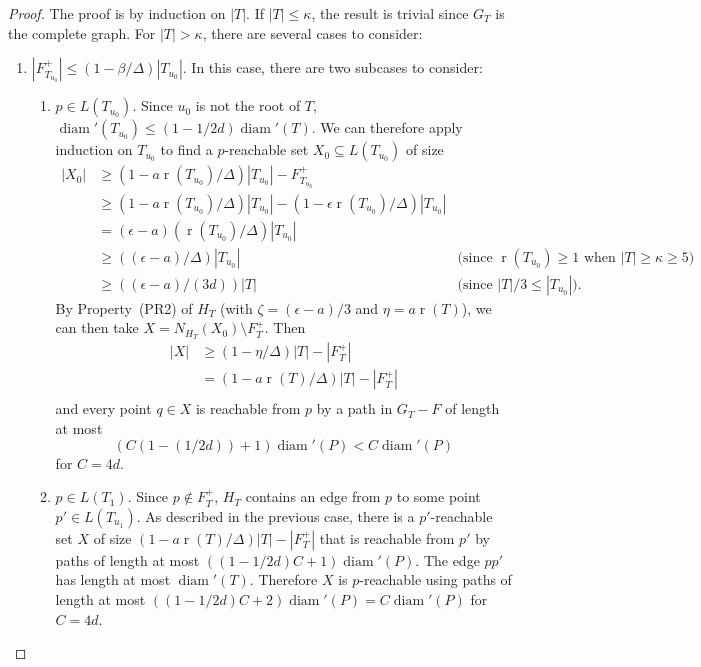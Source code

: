 \documentclass{patmorin}
\DeclareMathOperator{\rank}{r}
\DeclareMathOperator{\diam}{diam}
\begin{document}
\begin{proof}
  The proof is by induction on $|T|$.  If $|T|\le\kappa$, the result is
  trivial since $G_T$ is the complete graph.  For $|T|>\kappa$, there
  are several cases to consider:
  \begin{enumerate}
    \item $|F^+_{T_{u_0}}|\le (1-\beta/\Delta)|T_{u_0}|$. In this case, there are two subcases
    to consider:
    \begin{enumerate}
      \item $p\in L(T_{u_0})$. 
        Since $u_0$ is not the root of $T$, $\diam'(T_{u_0}) \le
        (1-1/2d)\diam'(T)$.  We can therefore apply induction on $T_{u_0}$
        to find a $p$-reachable set $X_0\subseteq L(T_{u_0})$ of size
\begin{align*}
  |X_0| & \ge (1-a\rank(T_{u_0})/\Delta)|T_{u_0}|-F^+_{T_{u_0}} \\
        & \ge (1-a\rank(T_{u_0})/\Delta)|T_{u_0}|-(1-\epsilon\rank(T_{u_0})/\Delta)|T_{u_0}| \\
        & = (\epsilon-a)(\rank(T_{u_0})/\Delta)|T_{u_0}| \\
        & \ge ((\epsilon-a)/\Delta)|T_{u_0}| 
    & \text{(since $\rank(T_{u_0})\ge 1$ when $|T|\ge \kappa \ge 5$)} \\
        & \ge ((\epsilon-a)/(3d))|T| 
        & \text{(since $|T|/3\le |T_{u_0}|$).} 
\end{align*}
      By Property~(PR2) of $H_T$ (with $\zeta = (\epsilon-a)/3$ and $\eta = a\rank(T)$), we can then take $X=N_{H_T}(X_0)\setminus F^+_T$.  Then 
      \begin{align*}
         |X| & \ge (1-\eta/\Delta)|T|-|F^+_T| \\
             & = (1-a\rank(T)/\Delta)|T|-|F^+_T| \\
      \end{align*} and every point $q\in X$ is reachable from $p$ by a path in $G_T-F$ of length at most
        \[ (C(1-(1/2d))+1)\diam'(P) < C\diam'(P) \]
       for $C= 4d$.

      \item $p\in L(T_1)$. Since $p\not\in F^+_T$, $H_T$ contains an
      edge from $p$ to some point $p'\in L(T_{u_1})$.  As described
      in the previous case, there is a $p'$-reachable set $X$ of
      size $(1-a\rank(T)/\Delta)|T|-|F^+_T|$ that is reachable from $p'$
      by paths of length at most $((1-1/2d)C+1)\diam'(P)$.
      The edge $pp'$ has length at most
      $\diam'(T)$. Therefore $X$ is $p$-reachable using
      paths of length at most $((1-1/2d)C+2)\diam'(P)
      = C\diam'(P)$ for $C= 4d$.
    \end{enumerate}


\end{enumerate}
\end{proof}
\end{document}
